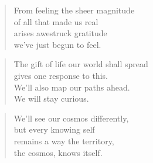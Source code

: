 \documentclass[10pt,a4paper]{article}
\begin{document}
\begin{multicols}{2}
\begin{verse}
From feeling the sheer magnitude\\
of all that made us real\\
arises awestruck gratitude\\
we’ve just begun to feel.
\end{verse}

\begin{verse}
The gift of life our world shall spread\\
gives one response to this.\\
We’ll also map our paths ahead.\\
We will stay curious.
\end{verse}

\begin{verse}
We’ll see our cosmos differently,\\
but every knowing self\\
remains a way the territory,\\
the cosmos, knows itself.
\end{verse}

\end{multicols}
\end{document}
